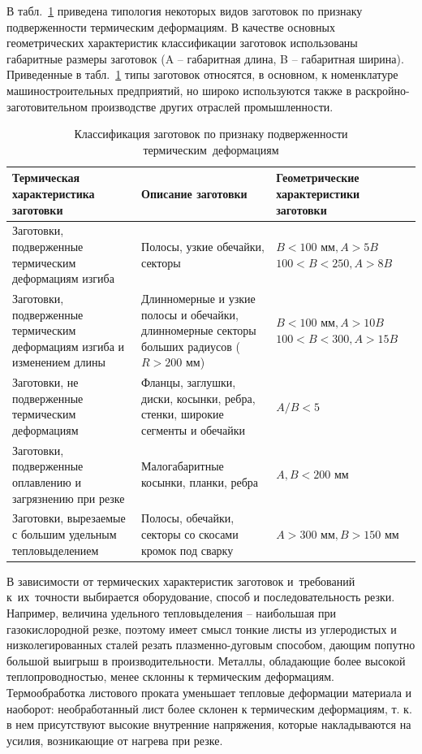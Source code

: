 \documentclass[11pt,twoside,openany]{report}
\begin{document}
В табл.~\ref{thermal-classification}
приведена типология некоторых видов заготовок
по признаку подверженности термическим деформациям.
В качестве основных геометрических характеристик
классификации заготовок использованы габаритные размеры заготовок
(A -- габаритная длина,
B -- габаритная ширина).
Приведенные в табл.~\ref{thermal-classification}
типы заготовок относятся,
в основном, к номенклатуре машиностроительных предприятий,
но широко используются также в раскройно-заготовительном производстве
других отраслей промышленности.

\begin{table}
  \caption{
    Классификация заготовок по признаку подверженности термическим~деформациям
    }
  \label{thermal-classification}
  \begin{tabular}{ p{} | p{} | p{} }
  \hline
  Термическая характеристика заготовки
    & Описание заготовки
    & Геометрические характеристики заготовки \\
  \hline
  Заготовки, подверженные термическим деформациям изгиба
    & Полосы, узкие обечайки, секторы
    &	$B<100 \text{ мм}, A>5B$ $100<B<250, A>8B$ \\
  Заготовки, подверженные термическим деформациям изгиба и изменением длины
    & Длинномерные и узкие полосы и обечайки, длинномерные секторы больших радиусов ($R>200$ мм)
    & $B <100 \text{ мм}, A>10B$ $100<B< 300, A>15B$ \\
  Заготовки, не подверженные термическим деформациям
    & Фланцы, заглушки, диски, косынки, ребра, стенки, широкие сегменты и обечайки
    & $A/B < 5$ \\
  Заготовки, подверженные оплавлению и загрязнению при резке
    & Малогабаритные косынки, планки, ребра
    & $ A, B <200 \text{ мм}$ \\
  Заготовки, вырезаемые с большим удельным тепловыделением
    & Полосы, обечайки, секторы со скосами кромок под сварку
    & $ A>300 \text{ мм}, B>150 \text{ мм}$ \\
  \hline
  \end{tabular}
\end{table}

В зависимости от термических характеристик заготовок
и~требований к~их~точности выбирается оборудование,
способ и последовательность резки.
Например, величина удельного тепловыделения --
наибольшая при газокислородной резке,
поэтому имеет смысл тонкие листы из углеродистых и
низколегированных сталей резать плазменно-дуговым способом,
дающим попутно большой выигрыш в производительности.
Металлы, обладающие более высокой теплопроводностью,
менее склонны к термическим деформациям.
Термообработка листового проката уменьшает
тепловые деформации материала и наоборот:
необработанный лист более склонен к термическим деформациям,
т. к. в нем присутствуют высокие внутренние  напряжения,
которые накладываются на усилия, возникающие от  нагрева при резке.
\end{document}
